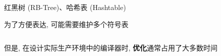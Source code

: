 \begin{frame}{}

  \vspace{0.50cm}
  \begin{center}
    红黑树 (RB-Tree)、哈希表 (Hashtable)
  \end{center}
\end{frame}

\begin{frame}{}
  \begin{center}
    为了方便表达, 可能需要维护多个符号表
  \end{center}

\end{frame}

\begin{frame}{}
  \begin{center}
  \end{center}

  \begin{columns}
  \end{columns}

  \vspace{0.30cm}
  \begin{center}
    但是, 在设计实际生产环境中的编译器时, {\bf 优化}通常占用了大多数时间
  \end{center}
\end{frame}
